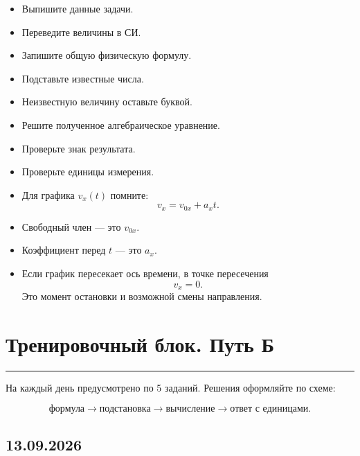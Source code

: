 \documentclass[a4paper,12pt]{article}
\newcommand{\sectionline}{%
  \par\vspace{-0.5em}%
  \noindent\textcolor{accent}{\rule{\linewidth}{0.7pt}}%
  \par\vspace{0.5em}%
}
\begin{document}
\begin{itemize}
  \item Выпишите данные задачи.

  \item Переведите величины в СИ.

  \item Запишите общую физическую формулу.

  \item Подставьте известные числа.

  \item Неизвестную величину оставьте буквой.

  \item Решите полученное алгебраическое уравнение.

  \item Проверьте знак результата.

  \item Проверьте единицы измерения.

  \item Для графика \(v_x(t)\) помните:
  \[
    v_x=v_{0x}+a_xt.
  \]

  \item Свободный член --- это \(v_{0x}\).

  \item Коэффициент перед \(t\) --- это \(a_x\).

  \item Если график пересекает ось времени, в точке пересечения
  \[
    v_x=0.
  \]
  Это момент остановки и возможной смены направления.
\end{itemize}


\clearpage

\section*{Тренировочный блок. Путь Б}
\sectionline

На каждый день предусмотрено по 5 заданий.
Решения оформляйте по схеме:

\[
\text{формула}
\rightarrow
\text{подстановка}
\rightarrow
\text{вычисление}
\rightarrow
\text{ответ с единицами}.
\]


\subsection*{13.09.2026}
\end{document}
